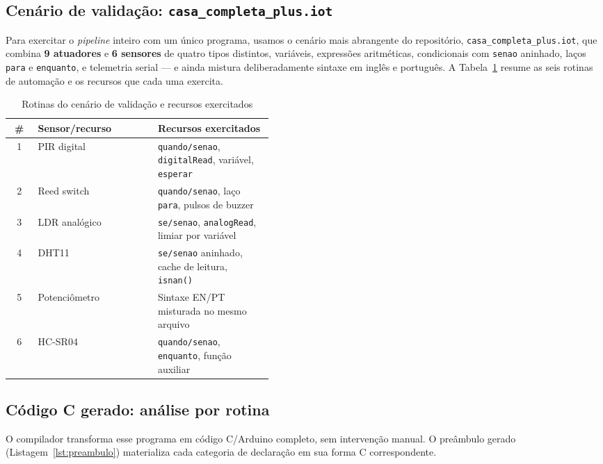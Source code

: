 \documentclass[conference]{IEEEtran}
\begin{document}
\subsection{Cenário de validação: \texttt{casa\_completa\_plus.iot}}

Para exercitar o \emph{pipeline} inteiro com um único programa, usamos o
cenário mais abrangente do repositório,
\texttt{casa\_completa\_plus.iot}, que combina \textbf{9 atuadores} e
\textbf{6 sensores} de quatro tipos distintos, variáveis, expressões
aritméticas, condicionais com \texttt{senao} aninhado, laços \texttt{para}
e \texttt{enquanto}, e telemetria serial --- e ainda mistura
deliberadamente sintaxe em inglês e português. A Tabela~\ref{tab:rotinas}
resume as seis rotinas de automação e os recursos que cada uma exercita.

\begin{table}[htbp]
\caption{Rotinas do cenário de validação e recursos exercitados}
\label{tab:rotinas}
\centering
\begin{tabular}{clp{0.44\linewidth}}
\toprule
\textbf{\#} & \textbf{Sensor/recurso} & \textbf{Recursos exercitados} \\
\midrule
1 & PIR digital & \texttt{quando/senao}, \texttt{digitalRead}, variável, \texttt{esperar} \\
2 & Reed switch & \texttt{quando/senao}, laço \texttt{para}, pulsos de buzzer \\
3 & LDR analógico & \texttt{se/senao}, \texttt{analogRead}, limiar por variável \\
4 & DHT11 & \texttt{se/senao} aninhado, cache de leitura, \texttt{isnan()} \\
5 & Potenciômetro & Sintaxe EN/PT misturada no mesmo arquivo \\
6 & HC-SR04 & \texttt{quando/senao}, \texttt{enquanto}, função auxiliar \\
\bottomrule
\end{tabular}
\end{table}

\subsection{Código C gerado: análise por rotina}
\label{subsec:codegen_analise}

O compilador transforma esse programa em código C/Arduino completo, sem
intervenção manual. O preâmbulo gerado (Listagem~\ref{lst:preambulo})
materializa cada categoria de declaração em sua forma C correspondente.
\end{document}
